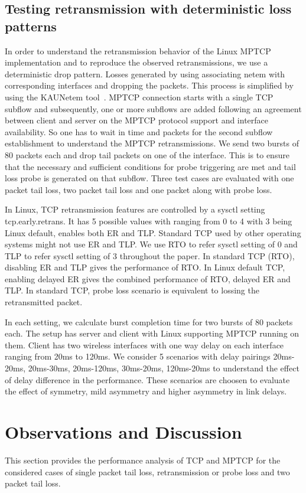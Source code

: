 \documentclass[10pt,draftcls,twocolumn]{IEEEconf}
\begin{document}
\subsection{Testing retransmission with deterministic loss patterns}
In order to understand the retransmission behavior of the Linux MPTCP implementation and to reproduce the observed retransmissions, we use a deterministic drop pattern.
Losses generated by using associating netem with corresponding interfaces and dropping the packets. This process is simplified by using the KAUNetem tool~\cite{Garcia2016}. 
MPTCP connection starts with a single TCP subflow and subsequently, one or more subflows are added following an agreement between client and server on the MPTCP protocol 
support and interface availability. So one has to wait in time and packets for the second subflow establishment to understand the MPTCP retransmissions. We send two bursts of 80 
packets each and drop tail packets on one of the interface. This is to ensure that the necessary and sufficient conditions for probe triggering are met and tail loss probe is generated on that
subflow. Three test cases are evaluated with one packet tail loss, two packet tail loss and  one packet along with probe loss. 

In Linux, TCP retransmission features are controlled by a sysctl setting tcp.early.retrans. It has 5 possible values with ranging from 0 to 4 with 3 being Linux default, enables both
ER and TLP. Standard TCP used by other operating systems might not use ER and TLP. We use RTO to refer sysctl setting of 0 and TLP to refer sysctl setting of 3 throughout the paper.
In standard TCP (RTO), disabling ER and TLP gives the performance of RTO. In Linux default TCP, enabling delayed ER gives the combined performance of RTO, delayed ER and TLP.
In standard TCP, probe loss scenario is equivalent to lossing the retransmitted packet.

In each setting, we calculate burst completion time for two bursts of 80 packets each. The setup has server and client with Linux supporting MPTCP running on them. Client has two wireless 
interfaces with one way delay on each interface ranging from 20ms to 120ms. We consider 5 scenarios with delay pairings 20ms-20ms, 20ms-30ms, 20ms-120ms, 30ms-20ms, 120ms-20ms to understand 
the effect of delay difference in the performance. These scenarios are choosen to evaluate the effect of symmetry, mild asymmetry and higher asymmetry in link delays. 

\section{Observations and Discussion}\label{disc}
This section provides the performance analysis of TCP and MPTCP for the considered cases of single packet tail loss, retransmission or probe loss and two packet 
tail loss.
\end{document}
